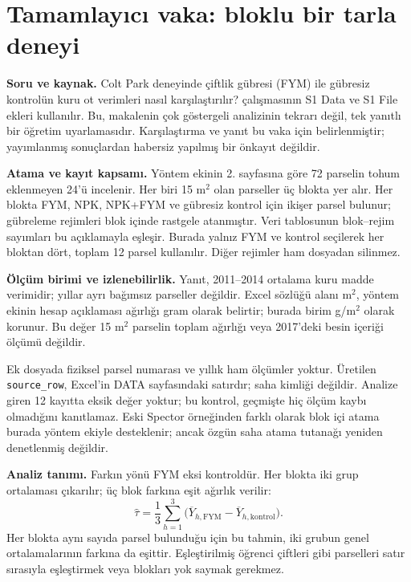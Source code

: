 \section{Tamamlayıcı vaka: bloklu bir tarla deneyi}
\label{sec:v1-colt-park}

\textbf{Soru ve kaynak.} Colt Park deneyinde çiftlik gübresi (FYM) ile
gübresiz kontrolün kuru ot verimleri nasıl karşılaştırılır?
\citet{villagalaviz2023} çalışmasının S1 Data ve S1 File ekleri kullanılır.
Bu, makalenin çok göstergeli analizinin tekrarı değil, tek yanıtlı bir
öğretim uyarlamasıdır. Karşılaştırma ve yanıt bu vaka için belirlenmiştir;
yayımlanmış sonuçlardan habersiz yapılmış bir önkayıt değildir.

\textbf{Atama ve kayıt kapsamı.} Yöntem ekinin 2. sayfasına göre 72
parselin tohum eklenmeyen 24'ü incelenir. Her biri 15 m$^2$ olan
parseller üç blokta yer alır. Her blokta FYM, NPK, NPK+FYM ve gübresiz
kontrol için ikişer parsel bulunur; gübreleme rejimleri blok içinde
rastgele atanmıştır. Veri tablosunun blok--rejim sayımları bu açıklamayla
eşleşir. Burada yalnız FYM ve kontrol seçilerek her bloktan dört,
toplam 12 parsel kullanılır. Diğer rejimler ham dosyadan silinmez.

\begin{researchbox}
\textbf{Ölçüm birimi ve izlenebilirlik.} Yanıt, 2011--2014 ortalama kuru
madde verimidir; yıllar ayrı bağımsız parseller değildir. Excel sözlüğü
alanı m$^2$, yöntem ekinin hesap açıklaması ağırlığı gram olarak belirtir;
burada birim g/m$^2$ olarak korunur. Bu değer 15 m$^2$ parselin toplam
ağırlığı veya 2017'deki besin içeriği ölçümü değildir.

Ek dosyada fiziksel parsel numarası ve yıllık ham ölçümler yoktur.
Üretilen \texttt{source\_row}, Excel'in DATA sayfasındaki satırdır;
saha kimliği değildir. Analize giren 12 kayıtta eksik değer yoktur;
bu kontrol, geçmişte hiç ölçüm kaybı olmadığını kanıtlamaz. Eski Spector
örneğinden farklı olarak blok içi atama burada yöntem ekiyle desteklenir;
ancak özgün saha atama tutanağı yeniden denetlenmiş değildir.
\end{researchbox}

\textbf{Analiz tanımı.} Farkın yönü FYM eksi kontroldür. Her blokta iki
grup ortalaması çıkarılır; üç blok farkına eşit ağırlık verilir:
\[
\widehat{\tau}=\frac{1}{3}\sum_{h=1}^{3}
\bigl(\overline{Y}_{h,\mathrm{FYM}}-\overline{Y}_{h,\mathrm{kontrol}}\bigr).
\]
Her blokta aynı sayıda parsel bulunduğu için bu tahmin, iki grubun genel
ortalamalarının farkına da eşittir. Eşleştirilmiş öğrenci çiftleri gibi
parselleri satır sırasıyla eşleştirmek veya blokları yok saymak gerekmez.

